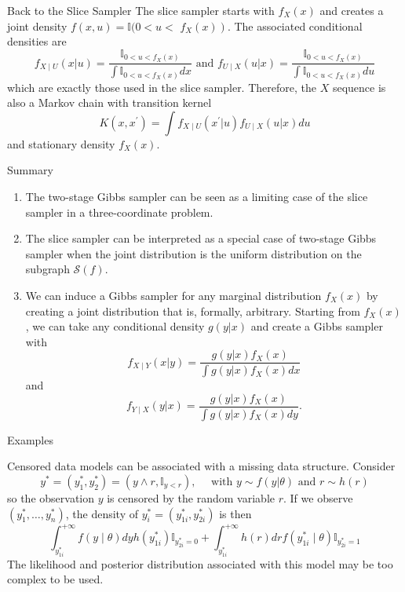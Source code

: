 \documentclass{beamer}
\begin{document}
\begin{frame}{Back to the Slice Sampler}
The slice sampler starts with $f_{X}(x)$ and creates a joint density $f(x, u)=\mathbb{I}(0<u<$ $\left.f_{X}(x)\right)$. The associated conditional densities are
$$
f_{X \mid U}(x|u)=\frac{\mathbb{I}_{0<u<f_{X}(x)}}{\int \mathbb{I}_{0<u<f_{X}(x)} d x} 
\text{ and } 
f_{U \mid X}(u|x)=\frac{\mathbb{I}_{0<u<f_{X}(x)}}{\int \mathbb{I}_{0<u<f_{X}(x)} d u}
$$ 
which are exactly those used in the slice sampler. Therefore, the $X$ sequence is also a Markov chain with transition kernel
$$
K\left(x, x^{\prime}\right)=\int f_{X \mid U}\left(x^{\prime}| u\right) f_{U \mid X}(u|x) d u
$$
and stationary density $f_{X}(x)$.
\end{frame}

\begin{frame}{Summary}
\begin{enumerate}
	\item The two-stage Gibbs sampler can be seen as a limiting case of the slice sampler in a three-coordinate problem.
	\item The slice sampler can be interpreted as a special case of two-stage Gibbs sampler when the joint distribution is the uniform distribution on the subgraph $\mathscr{S}(f)$.
	\item We can induce a Gibbs sampler for any marginal distribution $f_{X}(x)$ by creating a joint distribution that is, formally, arbitrary. Starting from $f_{X}(x)$, we can take any conditional density $g(y|x)$ and create a Gibbs sampler with
	$$
	f_{X \mid Y}(x|y)=\frac{g(y|x) f_{X}(x)}{\int g(y|x) f_{X}(x) d x}
	$$
	and
	$$
	f_{Y \mid X}(y|x)=\frac{g(y|x) f_{X}(x)}{\int g(y|x) f_{X}(x) d y}.
	$$
\end{enumerate}
\end{frame}
\begin{frame}{Examples}
	\begin{example}
		Censored data models can be associated with a missing data structure. Consider
		$$
		y^{*}=\left(y_{1}^{*}, y_{2}^{*}\right)=\left(y \wedge r, \mathbb{I}_{y<r}\right), \quad \text { with } y \sim f(y|\theta) \text { and } r \sim h(r)
		$$
		so the observation $y$ is censored by the random variable $r$. If we observe $\left(y_{1}^{*}, \ldots, y_{n}^{*}\right)$, the density of $y_{i}^{*}=\left(y_{1 i}^{*}, y_{2 i}^{*}\right)$ is then
		$$
		\int_{y_{1 i}^{*}}^{+\infty} f(y \mid \theta) d y h\left(y_{1 i}^{*}\right) \mathbb{I}_{y_{2 i}^{*}=0}+\int_{y_{1 i}^{*}}^{+\infty} h(r) d r f\left(y_{1 i}^{*} \mid \theta\right) \mathbb{I}_{y_{2 i}^{*}=1}
		$$
		The likelihood and
		posterior distribution associated with this model may be too complex to be
		used.
	\end{example}
\end{frame}
\end{document}
